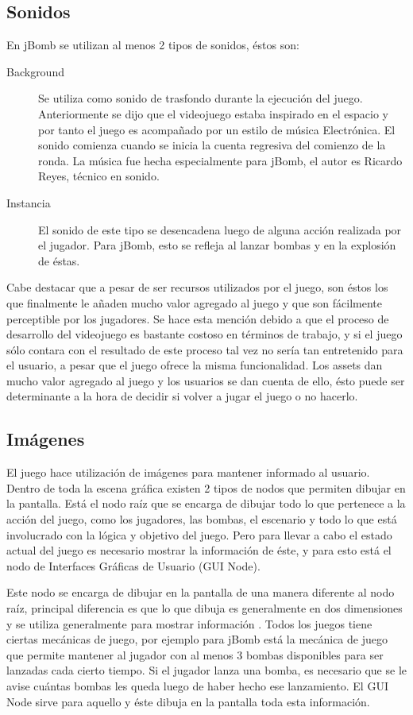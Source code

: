 \documentclass[a4paper,12pt,openany,oneside]{book}
\begin{document}
\subsection{Sonidos}
En jBomb se utilizan al menos 2 tipos de sonidos, éstos son:
\begin{description}
\item[Background] Se utiliza como sonido de trasfondo durante la ejecución del juego. Anteriormente se dijo que el videojuego estaba inspirado en el espacio y por tanto el juego es acompañado por un estilo de música Electrónica. El sonido comienza cuando se inicia la cuenta regresiva del comienzo de la ronda. La música fue hecha especialmente para jBomb, el autor es Ricardo Reyes, técnico en sonido.
\item[Instancia] El sonido de este tipo se desencadena luego de alguna acción realizada por el jugador. Para jBomb, esto se refleja al lanzar bombas y en la explosión de éstas.
\end{description}
Cabe destacar que a pesar de ser recursos utilizados por el juego, son éstos los que finalmente le añaden mucho valor agregado al juego y que son fácilmente perceptible por los jugadores. Se hace esta mención debido a que el proceso de desarrollo del videojuego es bastante costoso en términos de trabajo, y si el juego sólo contara con el resultado de este proceso tal vez no sería tan entretenido para el usuario, a pesar que el juego ofrece la misma funcionalidad. Los assets dan mucho valor agregado al juego y los usuarios se dan cuenta de ello, ésto puede ser determinante a la hora de decidir si volver a jugar el juego o no hacerlo.
\subsection{Imágenes} El juego hace utilización de imágenes para mantener informado al usuario. Dentro de toda la escena gráfica existen 2 tipos de nodos que permiten dibujar en la pantalla. Está el nodo raíz \cite{BEGINNERS} que se encarga de dibujar todo lo que pertenece a la acción del juego, como los jugadores, las bombas, el escenario y todo lo que está involucrado con la lógica y objetivo del juego. Pero para llevar a cabo el estado actual del juego es necesario mostrar la información de éste, y para esto está el nodo de Interfaces Gráficas de Usuario (GUI Node).

Este nodo se encarga de dibujar en la pantalla de una manera diferente al nodo raíz, principal diferencia es que lo que dibuja es generalmente en dos dimensiones y se utiliza generalmente para mostrar información \cite{BEGINNERS}. Todos los juegos tiene ciertas mecánicas de juego, por ejemplo para jBomb está la mecánica de juego que permite mantener al jugador con al menos 3 bombas disponibles para ser lanzadas cada cierto tiempo. Si el jugador lanza una bomba, es necesario que se le avise cuántas bombas les queda luego de haber hecho ese lanzamiento.  El GUI Node sirve para aquello y éste dibuja en la pantalla toda esta información.
\end{document}
